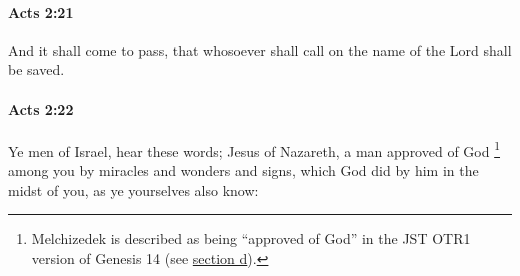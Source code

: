 		\paragraph{Acts 2:21} %
			\label{ACTS-2-21}

			And it shall come to pass, that whosoever shall call on the name of the Lord shall be saved.

			\begin{framed}
			\scriptsize
				\begin{compactdesc}
					\item[SBLG] 
				\end{compactdesc}
			\end{framed}

		\paragraph{Acts 2:22} %
			\label{ACTS-2-22}

			Ye men of Israel, hear these words; Jesus of Nazareth, a man approved of God%
				\footnote{%
					Melchizedek is described as being ``approved of God'' in the JST OTR1 version of Genesis 14 (see \hyperlink{JST-OTR1-GENESIS-14-d}{section d}).
					}
			among you by miracles and wonders and signs, which God did by him in the midst of you, as ye yourselves also know:

